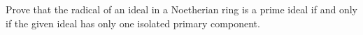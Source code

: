 Prove that the radical of an ideal in a Noetherian ring is a prime ideal if and only if the given ideal has only one isolated primary component.
